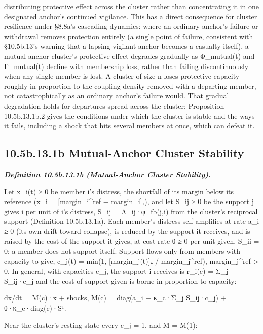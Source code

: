 \documentclass[
]{article}
\begin{document}
distributing protective effect across the cluster rather than
concentrating it in one designated anchor's continued vigilance. This
has a direct consequence for cluster resilience under §8.8a's cascading
dynamics: where an ordinary anchor's failure or withdrawal removes
protection entirely (a single point of failure, consistent with
§10.5b.13's warning that a lapsing vigilant anchor becomes a casualty
itself), a mutual anchor cluster's protective effect degrades gradually
as Φ\_mutual(t) and Γ\_mutual(t) decline with membership loss, rather
than failing discontinuously when any single member is lost. A cluster
of size n loses protective capacity roughly in proportion to the
coupling density removed with a departing member, not catastrophically
as an ordinary anchor's failure would. That gradual degradation holds
for departures spread across the cluster; Proposition 10.5b.13.1b.2
gives the conditions under which the cluster is stable and the ways it
fails, including a shock that hits several members at once, which can
defeat it.

\hypertarget{b.13.1b-mutual-anchor-cluster-stability}{%
\subsection{10.5b.13.1b Mutual-Anchor Cluster
Stability}\label{b.13.1b-mutual-anchor-cluster-stability}}

\emph{\textbf{Definition 10.5b.13.1b (Mutual-Anchor Cluster
Stability).}}

Let x\_i(t) ≥ 0 be member i's distress, the shortfall of its margin
below its reference (x\_i = {[}margin\_i\^{}ref − margin\_i{]}₊), and
let S\_ij ≥ 0 be the support j gives i per unit of i's distress, S\_ij =
Λ\_ij·φ\_fb(j,i) from the cluster's reciprocal support (Definition
10.5b.13.1a). Each member's distress self-amplifies at rate a\_i ≥ 0
(its own drift toward collapse), is reduced by the support it receives,
and is raised by the cost of the support it gives, at cost rate θ ≥ 0
per unit given. S\_ii = 0: a member does not support itself. Support
flows only from members with capacity to give, c\_j(t) = min(1,
{[}margin\_j(t){]}₊ / margin\_j\^{}ref), margin\_j\^{}ref \textgreater{}
0. In general, with capacities c\_j, the support i receives is r\_i(c) =
Σ\_j S\_ij·c\_j and the cost of support given is borne in proportion to
capacity:

dx/dt = M(c)·x + shocks, M(c) = diag(a\_i − κ\_c·Σ\_j S\_ij·c\_j) +
θ·κ\_c·diag(c)·Sᵀ.

Near the cluster's resting state every c\_j = 1, and M = M(1):
\end{document}
